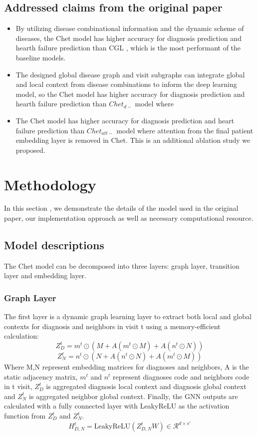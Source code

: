 \documentclass[11pt,a4paper,fleqn]{article}
\begin{document}
\subsection{Addressed claims from the original paper}
\begin{itemize}
    \item By utilizing disease combinational information and the dynamic scheme
    of diseases, the Chet model has higher accuracy for diagnosis prediction and
    hearth failure prediction than CGL \cite{cgl}, which is the most performant
    of the baseline models. 
    \item The designed global disease graph and visit subgraphs can integrate
    global and local context from disease combinations to inform the deep
    learning model, so the Chet model has higher accuracy for diagnosis
    prediction and hearth failure prediction than $Chet_{d-}$ model where
    \item The Chet model has higher accuracy for diagnosis prediction and heart
    failure prediction than $Chet_{att-}$ model where attention from the final
    patient embedding layer is removed in Chet. This is an additional ablation
    study we proposed.
\end{itemize}

\section{Methodology}
In this section , we demonstrate the details of the model used in the original
paper, our implementation approach as well as necessary computational resource.
\subsection{Model descriptions}
The Chet model can be decomposed into three layers: graph layer, transition
layer and embedding layer.

\subsubsection{Graph Layer}
The first layer is a dynamic graph learning layer to extract both local and
global contexts for diagnosis and neighbors in visit t using a memory-efficient
calculation:
\begin{equation}
  Z_D^t =m^t \odot (M + A(m^t\odot M) + A(n^t\odot N))
\end{equation}
\begin{equation}
  Z_N^t =n^t \odot (N + A(n^t\odot N) + A(m^t\odot M))
\end{equation}
Where M,N represent embedding matrices for diagnoses and neighbors, A is the
static adjacency matrix, $m^t$ and $n^t$ represent diagnoses code and neighbors
code in t visit, $Z_D^t$ is aggregated diagnosis local context and diagnosis
global context and $Z_N^t$ is aggregated neighbor global context. Finally, the
GNN outputs are calculated with a fully connected layer with LeakyReLU as the
activation function from $Z_D^t$ and $Z_N^t$.
\begin{equation}
  H^t_{D,N}=\textrm{LeakyReLU}(Z^t_{D,N}W)\in\mathcal{R}^{d\times s'}
\end{equation}
\end{document}
